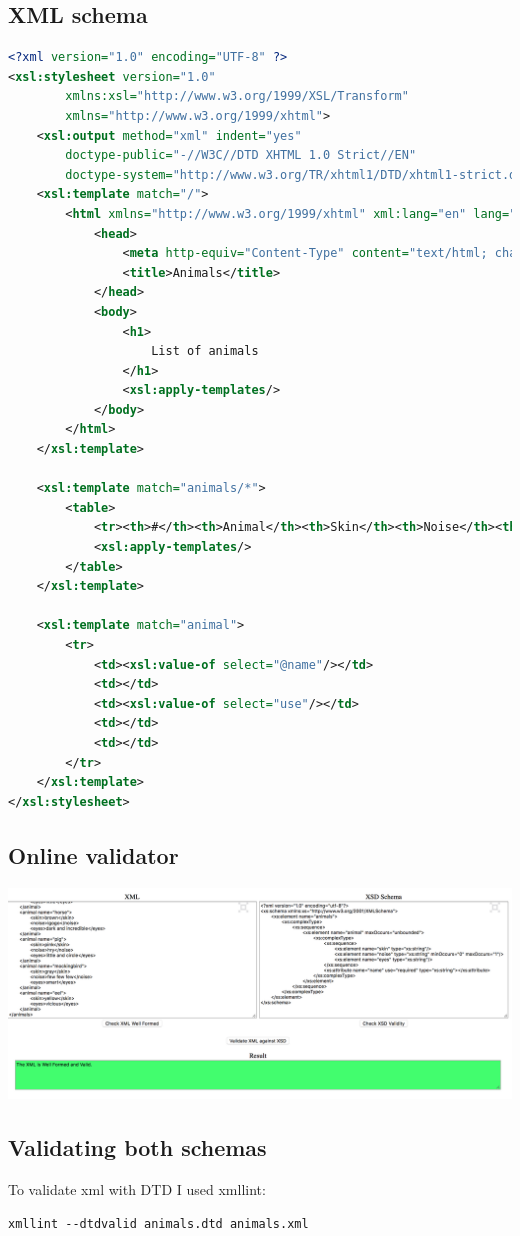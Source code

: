 \documentclass[a4paper,11pt]{article}
\theoremstyle{mytheor}
\begin{document}
\subsection{XML schema}
\begin{lstlisting}[language=xml]
<?xml version="1.0" encoding="UTF-8" ?>
<xsl:stylesheet version="1.0" 
        xmlns:xsl="http://www.w3.org/1999/XSL/Transform" 
        xmlns="http://www.w3.org/1999/xhtml">
    <xsl:output method="xml" indent="yes"
        doctype-public="-//W3C//DTD XHTML 1.0 Strict//EN" 
        doctype-system="http://www.w3.org/TR/xhtml1/DTD/xhtml1-strict.dtd"/>
    <xsl:template match="/">
        <html xmlns="http://www.w3.org/1999/xhtml" xml:lang="en" lang="en">
            <head>
                <meta http-equiv="Content-Type" content="text/html; charset=UTF-8" />
                <title>Animals</title>
            </head>
            <body>
                <h1>
                    List of animals 
                </h1>
                <xsl:apply-templates/>
            </body>
        </html>
    </xsl:template>

    <xsl:template match="animals/*">
        <table>
            <tr><th>#</th><th>Animal</th><th>Skin</th><th>Noise</th><th>Eyes</th></tr>
            <xsl:apply-templates/>
        </table>
    </xsl:template>

    <xsl:template match="animal">
        <tr>
            <td><xsl:value-of select="@name"/></td>
            <td></td>
            <td><xsl:value-of select="use"/></td>
            <td></td>
            <td></td>
        </tr>
    </xsl:template>
</xsl:stylesheet>
\end{lstlisting}

\subsection{Online validator}
\includegraphics[width=18cm]{validator.png}
\subsection{Validating both schemas}
To validate xml with DTD I used xmllint:
\begin{lstlisting}
xmllint --dtdvalid animals.dtd animals.xml
\end{lstlisting}
\end{document}
